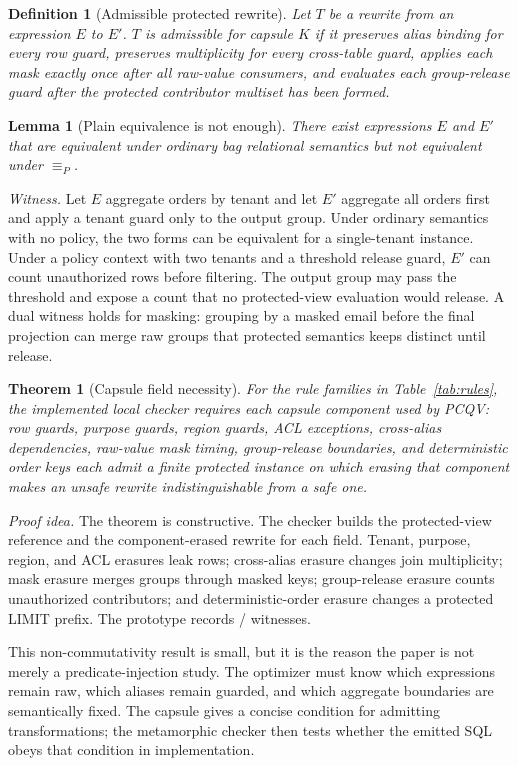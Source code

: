 \documentclass[conference]{IEEEtran}
\newcommand{\pcqv}{PCQV}
\newtheorem{theorem}{Theorem}
\newtheorem{lemma}{Lemma}
\newtheorem{definition}{Definition}
\begin{document}
\begin{definition}[Admissible protected rewrite]
Let $T$ be a rewrite from an expression $E$ to $E'$. $T$ is admissible for capsule $K$ if it preserves alias binding for every row guard, preserves multiplicity for every cross-table guard, applies each mask exactly once after all raw-value consumers, and evaluates each group-release guard after the protected contributor multiset has been formed.
\end{definition}

\begin{lemma}[Plain equivalence is not enough]
There exist expressions $E$ and $E'$ that are equivalent under ordinary bag relational semantics but not equivalent under $\equiv_P$.
\end{lemma}
\textit{Witness.} Let $E$ aggregate orders by tenant and let $E'$ aggregate all orders first and apply a tenant guard only to the output group. Under ordinary semantics with no policy, the two forms can be equivalent for a single-tenant instance. Under a policy context with two tenants and a threshold release guard, $E'$ can count unauthorized rows before filtering. The output group may pass the threshold and expose a count that no protected-view evaluation would release. A dual witness holds for masking: grouping by a masked email before the final projection can merge raw groups that protected semantics keeps distinct until release.

\begin{theorem}[Capsule field necessity]
For the rule families in Table~\ref{tab:rules}, the implemented local checker requires each capsule component used by \pcqv{}: row guards, purpose guards, region guards, ACL exceptions, cross-alias dependencies, raw-value mask timing, group-release boundaries, and deterministic order keys each admit a finite protected instance on which erasing that component makes an unsafe rewrite indistinguishable from a safe one.
\end{theorem}
\textit{Proof idea.} The theorem is constructive. The checker builds the protected-view reference and the component-erased rewrite for each field. Tenant, purpose, region, and ACL erasures leak rows; cross-alias erasure changes join multiplicity; mask erasure merges groups through masked keys; group-release erasure counts unauthorized contributors; and deterministic-order erasure changes a protected LIMIT prefix. The prototype records \CapsuleNecessaryFields{}/\CapsuleFieldsTested{} witnesses.

This non-commutativity result is small, but it is the reason the paper is not merely a predicate-injection study. The optimizer must know which expressions remain raw, which aliases remain guarded, and which aggregate boundaries are semantically fixed. The capsule gives a concise condition for admitting transformations; the metamorphic checker then tests whether the emitted SQL obeys that condition in implementation.
\end{document}
